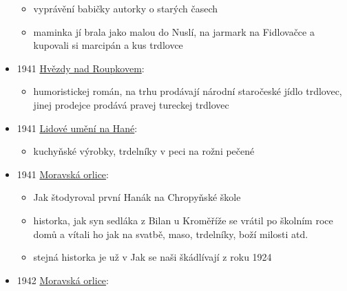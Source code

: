 \begin{itemize}
  \begin{itemize}
  \tightlist
  \item
    vyprávění babičky autorky o starých časech
  \item
    maminka jí brala jako malou do Nuslí, na jarmark na Fidlovačce a
    kupovali si marcipán a kus trdlovce
  \end{itemize}
\item
  1941
  \href{https://ceskadigitalniknihovna.cz/view/uuid:5a644b90-81df-11e4-9d8c-005056827e51?page=uuid\%3A645f2680-95c9-11e4-a2db-005056825209&source=nkp}{Hvězdy
  nad Roupkovem}:

  \begin{itemize}
  \tightlist
  \item
    humoristickej román, na trhu prodávají národní staročeské jídlo
    trdlovec, jinej prodejce prodává pravej tureckej trdlovec
  \end{itemize}
\item
  1941
  \href{https://ceskadigitalniknihovna.cz/view/uuid:3d76f2a0-2cf6-11e4-8e0d-005056827e51?page=uuid\%3A4ffb7cf0-4b61-11e4-aded-005056827e51&fulltext=trdeln\%C3\%ADk\%20OR\%20trdeln\%C3\%ADky\%20OR\%20trdeln\%C3\%ADk\%C5\%AF&source=nkp}{Lidové
  umění na Hané}:

  \begin{itemize}
  \tightlist
  \item
    kuchyňské výrobky, trdelníky v peci na rožni pečené
  \end{itemize}
\item
  1941
  \href{https://ceskadigitalniknihovna.cz/view/uuid:196e9f80-fea6-11de-bd64-000d606f5dc6?page=uuid:30a645e0-fac8-11de-b0ad-000d606f5dc6&fulltext=trdeln\%C3\%AD*&source=mzk}{Moravská
  orlice}:

  \begin{itemize}
  \tightlist
  \item
    Jak štodyroval první Hanák na Chropyňské škole
  \item
    historka, jak syn sedláka z Bilan u Kroměříže se vrátil po školním
    roce domů a vítali ho jak na svatbě, maso, trdelníky, boží milosti
    atd.
  \item
    stejná historka je už v Jak se naši škádlívají z roku 1924
  \end{itemize}
\item
  1942
  \href{https://ceskadigitalniknihovna.cz/view/uuid:a493cef0-fea6-11de-81a7-000d606f5dc6?page=uuid:30eaf000-fac8-11de-9bea-000d606f5dc6&fulltext=trdeln\%C3\%AD*&source=mzk}{Moravská
  orlice}:


\end{itemize}
